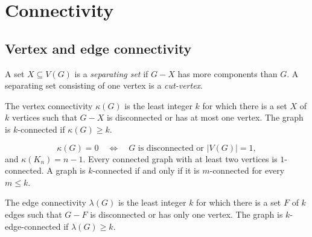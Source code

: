 \chapter{Connectivity}

\section{Vertex and edge connectivity}

\begin{notedefinition}
A set $X\subseteq V(G)$ is a \emph{separating set} if $G-X$ has more components than $G$.  A separating set consisting of one vertex is a \emph{cut-vertex}.
\end{notedefinition}

\begin{notedefinition}
The vertex connectivity $\kappa(G)$ is the least integer $k$ for which there is a set $X$ of $k$ vertices such that $G-X$ is disconnected or has at most one vertex.  The graph is $k$-connected if $\kappa(G)\ge k$.
\end{notedefinition}

\begin{noteremark}
\[
  \kappa(G)=0
  \quad\Longleftrightarrow\quad
  G\text{ is disconnected or }|V(G)|=1,
\]
and $\kappa(K_n)=n-1$.  Every connected graph with at least two vertices is $1$-connected.  A graph is $k$-connected if and only if it is $m$-connected for every $m\le k$.
\end{noteremark}

\begin{notedefinition}
The edge connectivity $\lambda(G)$ is the least integer $k$ for which there is a set $F$ of $k$ edges such that $G-F$ is disconnected or has only one vertex.  The graph is $k$-edge-connected if $\lambda(G)\ge k$.
\end{notedefinition}

